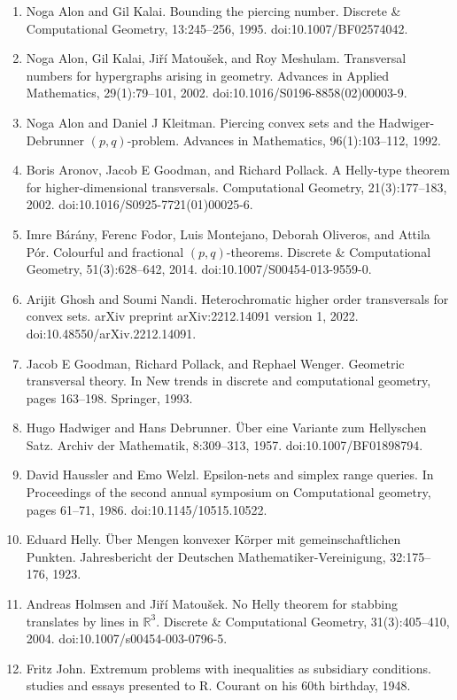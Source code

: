 \begin{enumerate}
\item[]  [1]  Noga Alon and Gil Kalai.  Bounding the piercing number.  Discrete \& Computational Geometry, 13:245–256, 1995.  doi:10.1007/BF02574042.  
\item[]  [2]  Noga Alon, Gil Kalai, Jiří Matoušek, and Roy Meshulam.  Transversal numbers for hypergraphs arising in geometry.  Advances in Applied Mathematics, 29(1):79–101, 2002.  doi:10.1016/S0196-8858(02)00003-9.  
\item[]  [3]  Noga Alon and Daniel J Kleitman.  Piercing convex sets and the Hadwiger-Debrunner $(p,q)$-problem.  Advances in Mathematics, 96(1):103–112, 1992.  
\item[]  [4]  Boris Aronov, Jacob E Goodman, and Richard Pollack.  A Helly-type theorem for higher-dimensional transversals.  Computational Geometry, 21(3):177–183, 2002.  doi:10.1016/S0925-7721(01)00025-6.  
\item[]  [5]  Imre Bárány, Ferenc Fodor, Luis Montejano, Deborah Oliveros, and Attila Pór.  Colourful and fractional $(p,q)$-theorems.  Discrete \& Computational Geometry, 51(3):628–642, 2014.  doi:10.1007/S00454-013-9559-0.  
\item[]  [6]  Arijit Ghosh and Soumi Nandi.  Heterochromatic higher order transversals for convex sets.  arXiv preprint arXiv:2212.14091 version 1, 2022.  doi:10.48550/arXiv.2212.14091.  
\item[]  [7]  Jacob E Goodman, Richard Pollack, and Rephael Wenger.  Geometric transversal theory.  In New trends in discrete and computational geometry, pages 163–198. Springer, 1993.  
\item[]  [8]  Hugo Hadwiger and Hans Debrunner.  Über eine Variante zum Hellyschen Satz.  Archiv der Mathematik, 8:309–313, 1957.  doi:10.1007/BF01898794.  
\item[]  [9]  David Haussler and Emo Welzl.  Epsilon-nets and simplex range queries.  In Proceedings of the second annual symposium on Computational geometry, pages 61–71, 1986.  doi:10.1145/10515.10522.  
\item[]  [10]  Eduard Helly.  Über Mengen konvexer Körper mit gemeinschaftlichen Punkten.  Jahresbericht der Deutschen Mathematiker-Vereinigung, 32:175–176, 1923.  
\item[]  [11]  Andreas Holmsen and Jiří Matoušek.  No Helly theorem for stabbing translates by lines in $\mathbb{R}^{3}$.  Discrete \& Computational Geometry, 31(3):405–410, 2004.  doi:10.1007/s00454-003-0796-5.  
\item[]  [12]  Fritz John.  Extremum problems with inequalities as subsidiary conditions. studies and essays presented to R. Courant on his 60th birthday, 1948.  

\end{enumerate}
